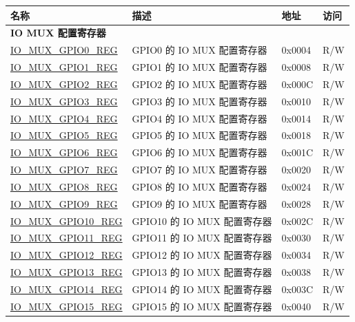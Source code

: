 \begin{longtable}{ | p{6cm} | p{7.2cm} | p{1.3cm} | p{1cm} | }
\hline\rowcolor{lightgray}
\textbf{名称} & \textbf{描述} &  \textbf{地址} & \textbf{访问} \\ \hline
\endhead
\multicolumn{4}{|l|}{\textbf{IO MUX 配置寄存器}} \\ \hline
\hyperref[regdesc:IOMUXGPIONREG]{IO\_MUX\_GPIO0\_REG} & GPIO0 的 IO MUX 配置寄存器 & 0x0004 & R/W \\ \hline
\hyperref[regdesc:IOMUXGPIONREG]{IO\_MUX\_GPIO1\_REG} & GPIO1 的 IO MUX 配置寄存器 & 0x0008 & R/W \\ \hline
\hyperref[regdesc:IOMUXGPIONREG]{IO\_MUX\_GPIO2\_REG} & GPIO2 的 IO MUX 配置寄存器 & 0x000C & R/W \\ \hline
\hyperref[regdesc:IOMUXGPIONREG]{IO\_MUX\_GPIO3\_REG} & GPIO3 的 IO MUX 配置寄存器 & 0x0010 & R/W \\ \hline
\hyperref[regdesc:IOMUXGPIONREG]{IO\_MUX\_GPIO4\_REG} & GPIO4 的 IO MUX 配置寄存器 & 0x0014 & R/W \\ \hline
\hyperref[regdesc:IOMUXGPIONREG]{IO\_MUX\_GPIO5\_REG} & GPIO5 的 IO MUX 配置寄存器 & 0x0018 & R/W \\ \hline
\hyperref[regdesc:IOMUXGPIONREG]{IO\_MUX\_GPIO6\_REG} & GPIO6 的 IO MUX 配置寄存器 & 0x001C & R/W \\ \hline
\hyperref[regdesc:IOMUXGPIONREG]{IO\_MUX\_GPIO7\_REG} & GPIO7 的 IO MUX 配置寄存器 & 0x0020 & R/W \\ \hline
\hyperref[regdesc:IOMUXGPIONREG]{IO\_MUX\_GPIO8\_REG} & GPIO8 的 IO MUX 配置寄存器 & 0x0024 & R/W \\ \hline
\hyperref[regdesc:IOMUXGPIONREG]{IO\_MUX\_GPIO9\_REG} & GPIO9 的 IO MUX 配置寄存器 & 0x0028 & R/W \\ \hline
\hyperref[regdesc:IOMUXGPIONREG]{IO\_MUX\_GPIO10\_REG} & GPIO10 的 IO MUX 配置寄存器 & 0x002C & R/W \\ \hline
\hyperref[regdesc:IOMUXGPIONREG]{IO\_MUX\_GPIO11\_REG} & GPIO11 的 IO MUX 配置寄存器 & 0x0030 & R/W \\ \hline
\hyperref[regdesc:IOMUXGPIONREG]{IO\_MUX\_GPIO12\_REG} & GPIO12 的 IO MUX 配置寄存器 & 0x0034 & R/W \\ \hline
\hyperref[regdesc:IOMUXGPIONREG]{IO\_MUX\_GPIO13\_REG} & GPIO13 的 IO MUX 配置寄存器 & 0x0038 & R/W \\ \hline
\hyperref[regdesc:IOMUXGPIONREG]{IO\_MUX\_GPIO14\_REG} & GPIO14 的 IO MUX 配置寄存器 & 0x003C & R/W \\ \hline
\hyperref[regdesc:IOMUXGPIONREG]{IO\_MUX\_GPIO15\_REG} & GPIO15 的 IO MUX 配置寄存器 & 0x0040 & R/W \\ \hline

\end{longtable}
